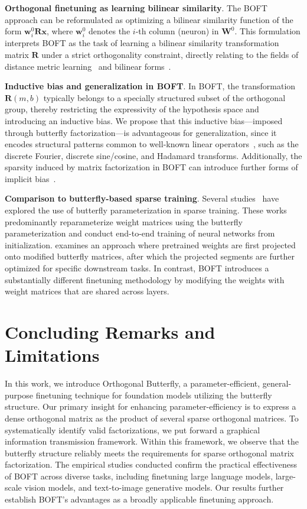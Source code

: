 \textbf{Orthogonal finetuning as learning bilinear similarity}. The BOFT approach can be reformulated as optimizing a bilinear similarity function of the form $\bm{w}^0_i\bm{R}\bm{x}$, where $\bm{w}^0_i$ denotes the $i$-th column (neuron) in $\bm{W}^0$. This formulation interprets BOFT as the task of learning a bilinear similarity transformation matrix $\bm{R}$ under a strict orthogonality constraint, directly relating to the fields of distance metric learning~\cite{xing2002distance} and bilinear forms~\cite{roman2005advanced}.

\textbf{Inductive bias and generalization in BOFT}. In BOFT, the transformation $\bm{R}(m,b)$ typically belongs to a specially structured subset of the orthogonal group, thereby restricting the expressivity of the hypothesis space and introducing an inductive bias. We propose that this inductive bias—imposed through butterfly factorization—is advantageous for generalization, since it encodes structural patterns common to well-known linear operators~\cite{dao2019kaleidoscope}, such as the discrete Fourier, discrete sine/cosine, and Hadamard transforms. Additionally, the sparsity induced by matrix factorization in BOFT can introduce further forms of implicit bias~\cite{gunasekar2017implicit,li2018algorithmic,liu2019neural}.

\textbf{Comparison to butterfly-based sparse training}. Several studies~\cite{dao2019learning,dao2019kaleidoscope,chen2022pixelated,dao2022monarch} have explored the use of butterfly parameterization in sparse training. These works predominantly reparameterize weight matrices using the butterfly parameterization and conduct end-to-end training of neural networks from initialization. \cite{dao2022monarch} examines an approach where pretrained weights are first projected onto modified butterfly matrices, after which the projected segments are further optimized for specific downstream tasks. In contrast, BOFT introduces a substantially different finetuning methodology by modifying the weights with weight matrices that are shared across layers.



\section{Concluding Remarks and Limitations}

In this work, we introduce Orthogonal Butterfly, a parameter-efficient, general-purpose finetuning technique for foundation models utilizing the butterfly structure. Our primary insight for enhancing parameter-efficiency is to express a dense orthogonal matrix as the product of several sparse orthogonal matrices. To systematically identify valid factorizations, we put forward a graphical information transmission framework. Within this framework, we observe that the butterfly structure reliably meets the requirements for sparse orthogonal matrix factorization. The empirical studies conducted confirm the practical effectiveness of BOFT across diverse tasks, including finetuning large language models, large-scale vision models, and text-to-image generative models. Our results further establish BOFT’s advantages as a broadly applicable finetuning approach.

